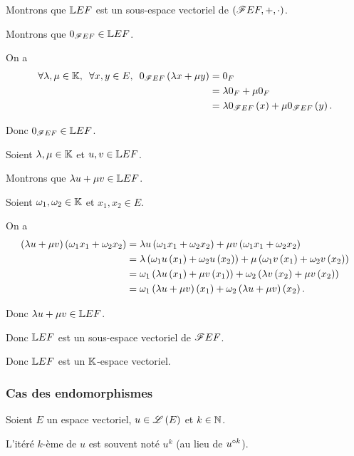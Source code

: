 \begin{dem}
Montrons que \(\mathbb{L}{E}{F}\) est un sous-espace vectoriel de \(\corps{\F{E}{F}}[+][\cdot]\).

Montrons que \(0_{\mathscr{F}{E}{F}}\in\mathbb{L}{E}{F}\).

On a \[\begin{aligned}
\quantifs{\forall\lambda,\mu\in\K;\forall x,y\in E}0_{\F{E}{F}}\paren{\lambda x+\mu y}&=0_F \\
&=\lambda0_F+\mu0_F \\
&=\lambda0_{\F{E}{F}}\paren{x}+\mu0_{\F{E}{F}}\paren{y}.
\end{aligned}\]

Donc \(0_{\mathscr{F}{E}{F}}\in\mathbb{L}{E}{F}\).

Soient \(\lambda,\mu\in\mathbb{K}\) et \(u,v\in\mathbb{L}{E}{F}\).

Montrons que \(\lambda u+\mu v\in\mathbb{L}{E}{F}\).

Soient \(\omega_1,\omega_2\in\mathbb{K}\) et \(x_1,x_2\in E\).

On a \[\begin{aligned}
\left(\lambda u+\mu v\right)\left(\omega_1x_1+\omega_2x_2\right)&=\lambda u\left(\omega_1x_1+\omega_2x_2\right)+\mu v\left(\omega_1x_1+\omega_2x_2\right) \\
&=\lambda\left(\omega_1u\left(x_1\right)+\omega_2u\left(x_2\right)\right)+\mu\left(\omega_1v\left(x_1\right)+\omega_2v\left(x_2\right)\right) \\
&=\omega_1\left(\lambda u\left(x_1\right)+\mu v\left(x_1\right)\right)+\omega_2\left(\lambda v\left(x_2\right)+\mu v\left(x_2\right)\right) \\
&=\omega_1\left(\lambda u+\mu v\right)\left(x_1\right)+\omega_2\left(\lambda u+\mu v\right)\left(x_2\right).
\end{aligned}\]

Donc \(\lambda u+\mu v\in\mathbb{L}{E}{F}\).

Donc \(\mathbb{L}{E}{F}\) est un sous-espace vectoriel de \(\mathscr{F}{E}{F}\).

Donc \(\mathbb{L}{E}{F}\) est un \(\mathbb{K}\)-espace vectoriel.
\end{dem}

\subsubsection{Cas des endomorphismes}

\begin{nota}
Soient \(E\) un espace vectoriel, \(u\in\mathscr{L}\left(E\right)\) et \(k\in\mathbb{N}\).

L'itéré \(k\)-ème de \(u\) est souvent noté \(u^k\) (au lieu de \(u^{\circ k}\)).
\end{nota}

